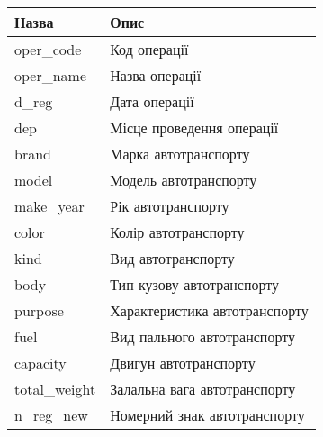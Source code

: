 \chapter{}

\begin{table}[h!]
  \small
  \centering
    \begin{tabular}{|l|l|}
    \hline
    \textbf{Назва} & \textbf{Опис}\\               \hline
    oper\_code & Код операції\\                    \hline
    oper\_name & Назва операції\\                  \hline
    d\_reg & Дата операції\\                       \hline
    dep & Місце проведення операції\\              \hline
    brand & Марка автотранспорту\\                 \hline
    model & Модель автотранспорту\\                \hline
    make\_year & Рік автотранспорту\\              \hline
    color & Колір автотранспорту\\                 \hline
    kind & Вид автотранспорту\\                    \hline
    body & Тип кузову автотранспорту\\             \hline
    purpose & Характеристика автотранспорту\\      \hline
    fuel & Вид пального автотранспорту\\           \hline
    capacity & Двигун автотранспорту\\             \hline
    total\_weight & Залальна вага автотранспорту\\ \hline
    n\_reg\_new & Номерний знак автотранспорту\\
    \hline
  \end{tabular}
  \caption{}
  \label{fig:csv-documet-structure}
\end{table}
